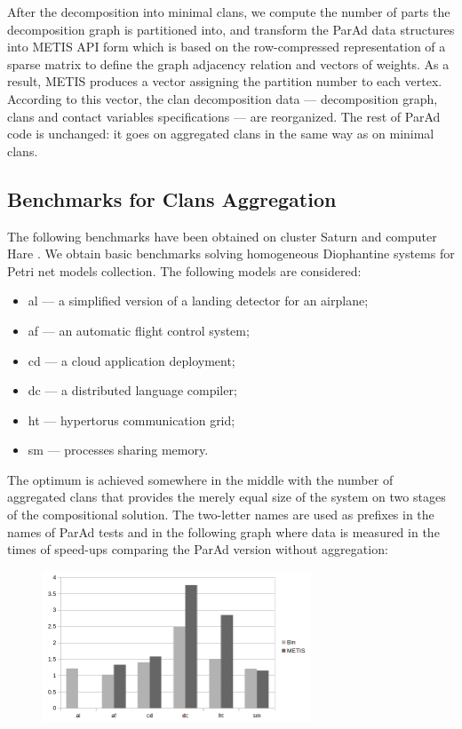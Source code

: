 \documentclass[10pt, a5paper]{article}
\begin{document}
After the decomposition into minimal clans, we compute the number of parts the decomposition graph is partitioned into, and transform the ParAd data structures into METIS API form which is based on the row-compressed representation of a sparse matrix to define the graph adjacency relation and vectors of weights. As a result, METIS produces a vector assigning the partition number to each vertex. According to this vector, the clan decomposition data --- decomposition graph, clans and contact variables specifications --- are reorganized. The rest of ParAd code \cite{bib3} is unchanged: it goes on aggregated clans in the same way as on minimal clans.

\subsection*{Benchmarks for Clans Aggregation}

The following benchmarks have been obtained on cluster Saturn and computer Hare \cite{bib2}. We obtain basic benchmarks solving homogeneous Diophantine systems for Petri net models collection. The following models are considered:

\begin{itemize}
  \item al --- a simplified version of a landing detector for an airplane;
  \item af --- an automatic flight control system;
  \item cd --- a cloud application deployment;
  \item dc --- a distributed language compiler;
  \item ht --- hypertorus communication grid;
  \item sm --- processes sharing memory.
\end{itemize}

The optimum is achieved somewhere in the middle with the number of aggregated clans that provides the merely equal size of the system on two stages of the compositional solution. The two-letter names are used as prefixes in the names of ParAd tests \cite{bib3} and in the following graph where data is measured in the times of speed-ups comparing the ParAd version without aggregation:

\begin{center}
\begin{figure}[h!]
  \centering
  \includegraphics[width=8cm]{Zaitsev4.png}

  \label{fig1}
\end{figure}
\end{center}
\end{document}
